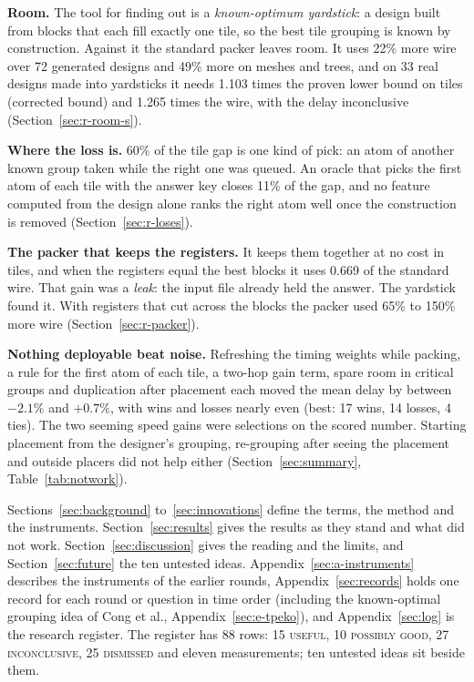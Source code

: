 \textbf{Room.} The tool for finding out is a \emph{known-optimum yardstick}: a design built from blocks that each fill exactly one tile, so the best tile grouping is known by construction. Against it the standard packer leaves room. It uses 22\% more wire over 72 generated designs and 49\% more on meshes and trees, and on 33 real designs made into yardsticks it needs 1.103 times the proven lower bound on tiles (corrected bound) and 1.265 times the wire, with the delay inconclusive (Section~\ref{sec:r-room-s}).

\textbf{Where the loss is.} 60\% of the tile gap is one kind of pick: an atom of another known group taken while the right one was queued. An oracle that picks the first atom of each tile with the answer key closes 11\% of the gap, and no feature computed from the design alone ranks the right atom well once the construction is removed (Section~\ref{sec:r-loses}).

\textbf{The packer that keeps the registers.} It keeps them together at no cost in tiles, and when the registers equal the best blocks it uses 0.669 of the standard wire. That gain was a \emph{leak}: the input file already held the answer. The yardstick found it. With registers that cut across the blocks the packer used 65\% to 150\% more wire (Section~\ref{sec:r-packer}).

\textbf{Nothing deployable beat noise.} Refreshing the timing weights while packing, a rule for the first atom of each tile, a two-hop gain term, spare room in critical groups and duplication after placement each moved the mean delay by between $-2.1\%$ and $+0.7\%$, with wins and losses nearly even (best: 17 wins, 14 losses, 4 ties). The two seeming speed gains were selections on the scored number. Starting placement from the designer's grouping, re-grouping after seeing the placement and outside placers did not help either (Section~\ref{sec:summary}, Table~\ref{tab:notwork}).

 Sections~\ref{sec:background} to~\ref{sec:innovations} define the terms, the method and the instruments. Section~\ref{sec:results} gives the results as they stand and what did not work. Section~\ref{sec:discussion} gives the reading and the limits, and Section~\ref{sec:future} the ten untested ideas. Appendix~\ref{sec:a-instruments} describes the instruments of the earlier rounds, Appendix~\ref{sec:records} holds one record for each round or question in time order (including the known-optimal grouping idea of Cong et al., Appendix~\ref{sec:e-tpeko}), and Appendix~\ref{sec:log} is the research register. The register has 88 rows: 15 \textsc{useful}, 10 \textsc{possibly good}, 27 \textsc{inconclusive}, 25 \textsc{dismissed} and eleven measurements; ten untested ideas sit beside them.

